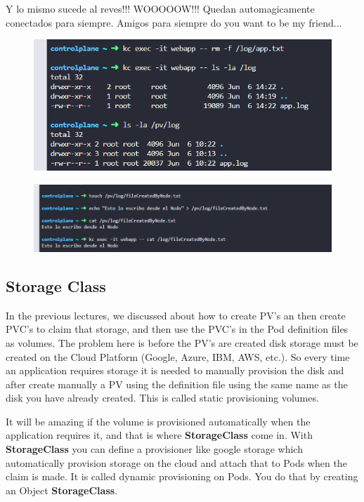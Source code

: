 \documentclass{article}
\begin{document}
Y lo mismo sucede al reves!!! WOOOOOW!!! Quedan automagicamente conectados para siempre. Amigos para siempre do you want to be my friend...

\begin{figure}[H]
    \includegraphics[width=\textwidth]{pictures/amigosparasiemrep.png}
\end{figure}
\begin{figure}[H]
    \includegraphics[width=\textwidth]{pictures/amigosforever.png}
\end{figure}



\subsection{Storage Class}

In the previous lectures, we discussed about how to create PV's an then create PVC's to claim that storage, and then use the PVC's in the Pod definition files as volumes. The problem here is before the PV's are created disk storage must be created on the Cloud Platform (Google, Azure, IBM, AWS, etc.). So every time an application requires storage it is needed to manually provision the disk and after create manually a PV using the definition file using the same name as the disk you have already created. This is called static provisioning volumes.

It will be amazing if the volume is provisioned automatically when the application requires it, and that is where \textbf{StorageClass} come in. With \textbf{StorageClass} you can define a provisioner like google storage which automatically provision storage on the cloud and attach that to Pods when the claim is made. It is called dynamic provisioning on Pods. You do that by creating an Object \textbf{StorageClass}.
\end{document}
